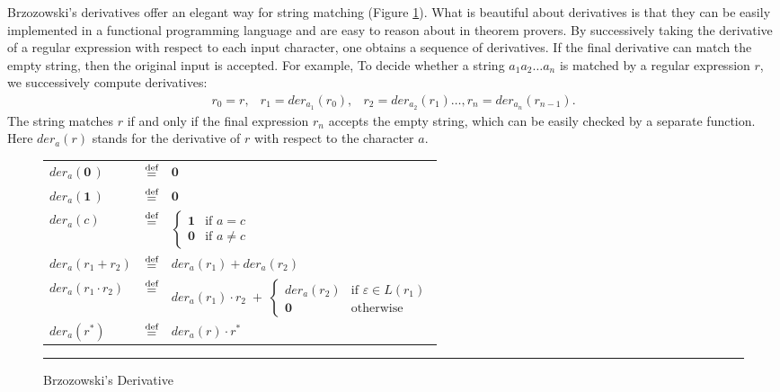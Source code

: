 \documentclass[12pt]{article}
\newcommand{\dn}{\ensuremath{\stackrel{\mbox{\scriptsize def}}{=}}}
\newcommand{\ZERO}{\textbf{0}}
\newcommand{\ONE}{\textbf{1}}
\newcommand{\der}{\textit{der}}
\begin{document}
Brzozowski’s derivatives offer an elegant way for string matching 
(Figure \ref{BrzozowskiDerivative}). What is beautiful about derivatives is that 
they can be easily implemented in a functional programming language and are easy to 
reason about in theorem provers. By successively taking the derivative of a regular 
expression with respect to each input character, one obtains a sequence of derivatives. 
If the final derivative can match the empty string, then the original input is accepted.
For example, To decide whether a string $a_1 a_2 \dots a_n$ is matched by a regular 
expression $r$, we successively compute derivatives:
\[
\begin{array}{rcl}
r_0 = r,& r_1 = \der_{a_1}(r_0),& r_2=\der_{a_2}(r_1) \dots, r_n = \der_{a_n}(r_{n-1}) .
\end{array}
\]
The string matches $r$ if and only if the final expression $r_n$ accepts the empty string,
which can be easily checked by a separate function.
 Here $\der_a(r)$ stands for the derivative of $r$ with respect to the character $a$.
\begin{figure}[ht]
  \begin{center}

  \renewcommand{\arraystretch}{1.5}
  \begin{tabular}{lcl}
    $\der_a(\ZERO\,)$            & \dn & $\ZERO$ \\
    $\der_a(\ONE\,)$             & \dn & $\ZERO$ \\
    $\der_a(c)$                  & \dn &
      $\begin{cases}
        \ONE  & \text{if } a = c \\
        \ZERO & \text{if } a \neq c
      \end{cases}$ \\
    $\der_a(r_1 + r_2)$          & \dn & $\der_a(r_1) + \der_a(r_2)$ \\
    $\der_a(r_1 \cdot r_2)$      & \dn &
      $\der_a(r_1) \cdot r_2 \;+\;
        \begin{cases}
          \der_a(r_2) & \text{if } \varepsilon \in L(r_1) \\
          \ZERO       & \text{otherwise}
        \end{cases}$ \\
    $\der_a(r^\ast)$             & \dn & $\der_a(r) \cdot r^\ast$
  \end{tabular}
  \renewcommand{\arraystretch}{1.0}
    
    \mbox{}
    \rule{\linewidth}{0.4pt}
  \caption{Brzozowski’s Derivative}\label{BrzozowskiDerivative}
  \end{center}
\end{figure}
\end{document}
